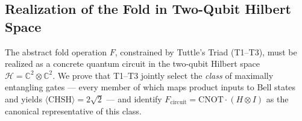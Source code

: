 %
%
%
%
%   

% 

\subsection{Realization of the Fold in Two-Qubit Hilbert Space}
\label{sec:fold_realization_weak}

The abstract fold operation $F$, constrained by Tuttle's Triad (T1--T3),
must be realized as a concrete quantum circuit in the two-qubit Hilbert
space $\mathcal{H} = \mathbb{C}^2 \otimes \mathbb{C}^2$. We prove that
T1--T3 jointly select the \emph{class} of maximally entangling gates ---
every member of which maps product inputs to Bell states and yields
$\langle\mathrm{CHSH}\rangle = 2\sqrt{2}$ --- and identify
$F_{\mathrm{circuit}} = \mathrm{CNOT}\cdot(H\otimes I)$ as the
canonical representative of this class.

